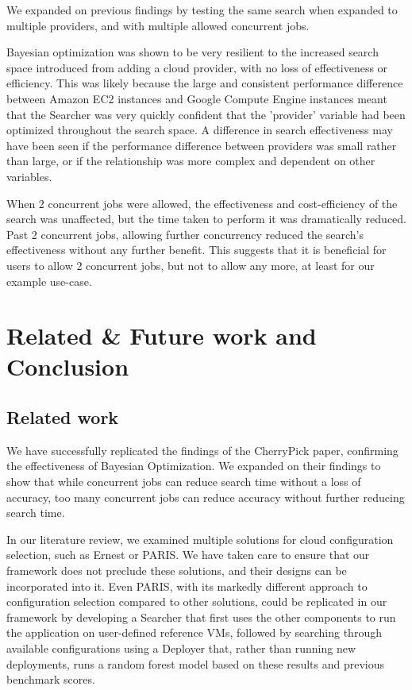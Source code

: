 \documentclass{report}
\begin{document}
We expanded on previous findings by testing the same search when expanded to multiple providers, and with multiple allowed concurrent jobs.

Bayesian optimization was shown to be very resilient to the increased search space introduced from adding a cloud provider, with no loss of effectiveness or efficiency. This was likely because the large and consistent performance difference between Amazon EC2 instances and Google Compute Engine instances meant that the Searcher was very quickly confident that the 'provider' variable had been optimized throughout the search space. A difference in search effectiveness may have been seen if the performance difference between providers was small rather than large, or if the relationship was more complex and dependent on other variables.

When 2 concurrent jobs were allowed, the effectiveness and cost-efficiency of the search was unaffected, but the time taken to perform it was dramatically reduced. Past 2 concurrent jobs, allowing further concurrency reduced the search's effectiveness without any further benefit. This suggests that it is beneficial for users to allow 2 concurrent jobs, but not to allow any more, at least for our example use-case. 
\chapter{Related \& Future work and Conclusion}
\section{Related work}
We have successfully replicated the findings of the CherryPick\cite{Alipourfard2017} paper, confirming the effectiveness of Bayesian Optimization. We expanded on their findings to show that while concurrent jobs can reduce search time without a loss of accuracy, too many concurrent jobs can reduce accuracy without further reducing search time.

In our literature review, we examined multiple solutions for cloud configuration selection, such as Ernest\cite{Venkataraman2016} or PARIS\cite{Yadwadkar2017}. We have taken care to ensure that our framework does not preclude these solutions, and their designs can be incorporated into it. Even PARIS, with its markedly different approach to configuration selection compared to other solutions, could be replicated in our framework by developing a Searcher that first uses the other components to run the application on user-defined reference VMs, followed by searching through available configurations using a Deployer that, rather than running new deployments, runs a random forest model based on these results and previous benchmark scores. 
\end{document}
